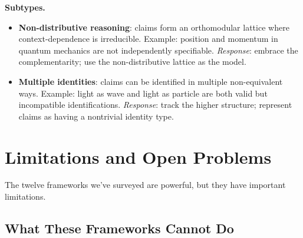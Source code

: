 \documentclass[11pt,letterpaper]{article}
\theoremstyle{definition}
\theoremstyle{remark}
\begin{document}
\textbf{Subtypes.}
\begin{itemize}
\item \textbf{Non-distributive reasoning}: claims form an orthomodular lattice where context-dependence is irreducible. Example: position and momentum in quantum mechanics are not independently specifiable.
  \emph{Response}: embrace the complementarity; use the non-distributive lattice as the model.

\item \textbf{Multiple identities}: claims can be identified in multiple non-equivalent ways. Example: light as wave and light as particle are both valid but incompatible identifications.
  \emph{Response}: track the higher structure; represent claims as having a nontrivial identity type.
\end{itemize}

\begin{center}
\end{center}

\newpage

\section{Limitations and Open Problems}
\label{sec:limitations}

The twelve frameworks we've surveyed are powerful, but they have important limitations.

\subsection{What These Frameworks Cannot Do}
\end{document}
